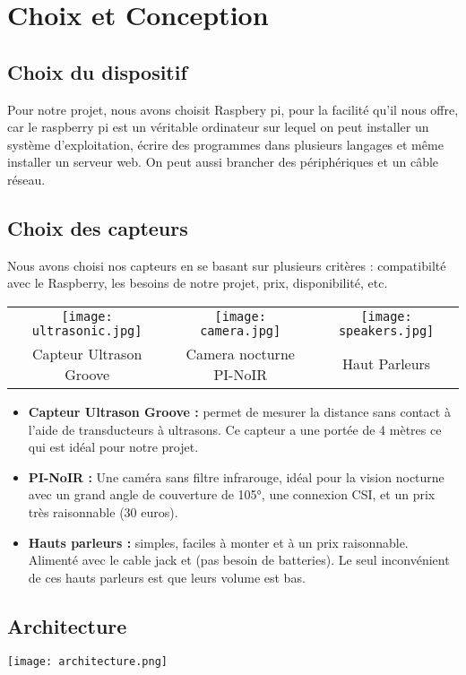 \section{Choix et Conception}
    
    \subsection{Choix du dispositif}
    
        Pour notre projet, nous avons choisit Raspbery pi, pour la facilité qu'il nous offre, car le raspberry pi est un véritable ordinateur sur lequel on peut installer un système d'exploitation, écrire des programmes dans plusieurs langages et même installer un serveur web. On peut aussi brancher des périphériques et un câble réseau.

    \subsection{Choix des capteurs}
    
        Nous avons choisi nos capteurs en se basant sur plusieurs critères : compatibilté avec le Raspberry, les besoins de notre projet, prix, disponibilité, etc.
        
        \begin{center}
        \begin{tabular}{ c c c }
         \texttt{[image: ultrasonic.jpg]} & \texttt{[image: camera.jpg]} & \texttt{[image: speakers.jpg]} \\ 
         Capteur Ultrason Groove & Camera nocturne PI-NoIR & Haut Parleurs \\   
        \end{tabular}
        \end{center}
        
        \begin{itemize}
            \item \textbf{Capteur Ultrason Groove : }permet de mesurer la distance sans contact à l'aide de transducteurs à ultrasons. Ce capteur a une portée de 4 mètres ce qui est idéal pour notre projet.
            \item \textbf{PI-NoIR : }Une caméra sans filtre infrarouge, idéal pour la vision nocturne avec un grand angle de couverture de 105°, une connexion CSI, et un prix très raisonnable (30 euros).
            \item \textbf{Hauts parleurs : } simples, faciles à monter et à un prix raisonnable. Alimenté avec le cable jack et (pas besoin de batteries). Le seul inconvénient de ces hauts parleurs est que leurs volume est bas.
        \end{itemize}
        
    \subsection{Architecture}
    \texttt{[image: architecture.png]}